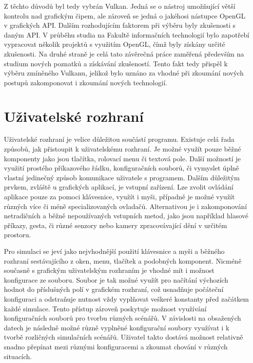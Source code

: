 Z těchto důvodů byl tedy vybrán Vulkan. Jedná se o nástroj umožňující větší kontrolu nad grafickým čipem, ale zároveň se jedná o jakéhosi nástupce OpenGL v grafických API. Dalším rozhodujícím faktorem při výběru byly zkušenosti s daným API. V průběhu studia na Fakultě informačních technologií bylo zapotřebí vypracovat několik projektů s využitím OpenGL, čímž byly získány určité zkušenosti. Na druhé straně je celá tato závěrečná práce zaměřená především na studium nových poznatků a získávání zkušeností. Tento fakt tedy přispěl k výběru zmíněného Vulkanu, jelikož bylo uznáno za vhodné při zkoumání nových postupů zakomponovat i zkoumání nových technologií.

\section{Uživatelské rozhraní}
Uživatelské rozhraní je velice důležitou součástí programu. Existuje celá řada způsobů, jak přistoupit k uživatelskému rozhraní. Je možné využít pouze běžné komponenty jako jsou tlačítka, rolovací menu či textová pole. Další možností je využití prostého příkazového řádku, konfiguračních souborů, či vymyslet úplně vlastní jedinečný způsob komunikace uživatele s programem. Dalším důležitým prvkem, zvláště u grafických aplikací, je vstupní zařízení. Lze zvolit ovládání aplikace pouze za pomoci klávesnice, využít i myši, případně je možné využít různých více či méně specializovaných ovladačů. Alternativou je i zakomponování netradičních a běžně nepoužívaných vstupních metod, jako jsou například hlasové příkazy, gesta, či různé senzory nebo kamery zpracovávající dění v určitém prostoru.

Pro simulaci se jeví jako nejvhodnější použití klávesnice a myši a běžného rozhraní sestávajícího z oken, menu, tlačítek a podobných komponent. Nicméně současně s grafickým uživatelským rozhraním je vhodné mít i možnost konfigurace ze souboru. Soubor je tak možné využít pro načítání výchozích hodnot do příslušných polí v grafickém rozhraní, což usnadňuje počáteční konfiguraci a odstraňuje nutnost vždy vyplňovat veškeré konstanty před začátkem každé simulace. Tento přístup zároveň poskytuje možnost využívání konfiguračních souborů pro tvorbu různých scénářů. V závislosti na obsažených datech je následně možné různě vyplněné konfigurační soubory využívat i k tvorbě rozličných simulačních scénářů. Uživatel takto dostává možnost relativně snadno přepínat mezi různými konfiguracemi a zkoumat chování v různých situacích.

